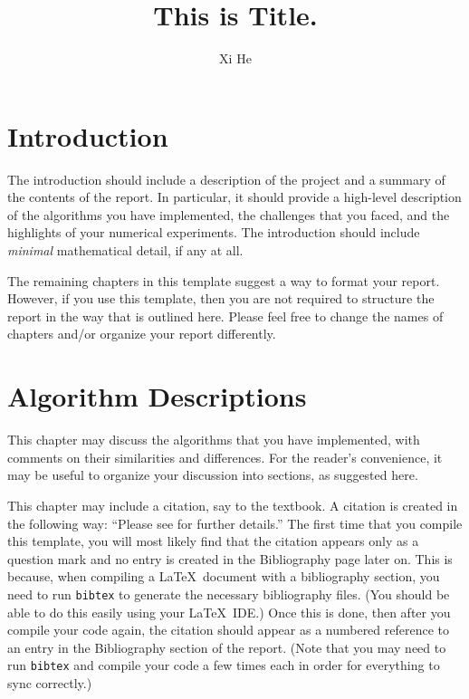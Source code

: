 \documentclass[11pt]{report}
\begin{document}
\author{Xi He}
\title {This is Title.}



\preface

\chapter{Introduction}

The introduction should include a description of the project and a summary of the contents of the report.  In particular, it should provide a high-level description of the algorithms you have implemented, the challenges that you faced, and the highlights of your numerical experiments.  The introduction should include \emph{minimal} mathematical detail, if any at all.

The remaining chapters in this template suggest a way to format your report.  However, if you use this template, then you are not required to structure the report in the way that is outlined here.  Please feel free to change the names of chapters and/or organize your report differently.

\chapter{Algorithm Descriptions}

This chapter may discuss the algorithms that you have implemented, with comments on their similarities and differences.  For the reader's convenience, it may be useful to organize your discussion into sections, as suggested here.

This chapter may include a citation, say to the textbook.  A citation is created in the following way: ``Please see \cite{NoceWrig06} for further details.''  The first time that you compile this template, you will most likely find that the citation appears only as a question mark and no entry is created in the Bibliography page later on.  This is because, when compiling a \LaTeX\ document with a bibliography section, you need to run \texttt{bibtex} to generate the necessary bibliography files.  (You should be able to do this easily using your \LaTeX\ IDE.)  Once this is done, then after you compile your code again, the citation should appear as a numbered reference to an entry in the Bibliography section of the report.  (Note that you may need to run \texttt{bibtex} and compile your code a few times each in order for everything to sync correctly.)
\end{document}

